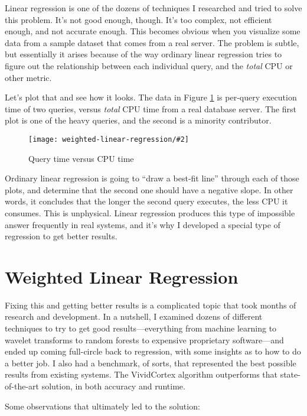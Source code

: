 \documentclass{vivid_layout}
\newcommand{\myfig}[3]{
	\begin{figure}[!htpb]
	\begin{center}
	\rule{0mm}{5mm}
	\texttt{[image: weighted-linear-regression/\#2]}
	\caption{#3}\label{fig:#2}
	\end{center}
	\end{figure}
}
\begin{document}
Linear regression is one of the dozens of techniques I researched and tried to solve this problem. It's not good enough, though. It's too complex, not efficient enough, and not accurate enough. This becomes obvious when you visualize some data from a sample dataset that comes from a real server. The problem is subtle, but essentially it arises because of the way ordinary linear regression tries to figure out the relationship between each individual query, and the \emph{total} CPU or other metric.

Let's plot that and see how it looks. The data in Figure \ref{fig:queries-vs-user_us} is per-query execution time of two queries, versus \emph{total} CPU time from a real database server. The first plot is one of the heavy queries, and the second is a minority contributor.

\myfig{\textwidth}{queries-vs-user_us}{Query time versus CPU time}

Ordinary linear regression is going to ``draw a best-fit line'' through each of those plots, and determine that the second one should have a negative slope. In other words, it concludes that the longer the second query executes, the less CPU it consumes. This is unphysical. Linear regression produces this type of impossible answer frequently in real systems, and it's why I developed a special type of regression to get better results.

\section{Weighted Linear Regression}

Fixing this and getting better results is a complicated topic that took months of research and development. In a nutshell, I examined dozens of different techniques to try to get good results---everything from machine learning to wavelet transforms to random forests to expensive proprietary software---and ended up coming full-circle back to regression, with some insights as to how to do a better job. I also had a benchmark, of sorts, that represented the best possible results from existing systems. The VividCortex algorithm outperforms that state-of-the-art solution, in both accuracy and runtime.

Some observations that ultimately led to the solution:
\end{document}
